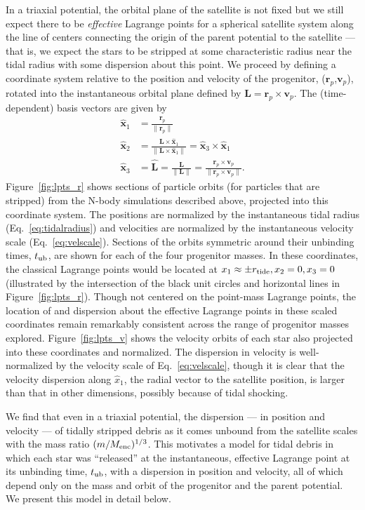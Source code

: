 \documentclass[letterpaper,12pt,preprint]{aastex}
\newcommand{\rtide}{r_{\rm tide}}
\newcommand{\bs}{\boldsymbol}
\newcommand{\tub}{t_{\rm ub}}
\begin{document}
In a triaxial potential, the orbital plane of the satellite is not fixed but we still expect there to be \emph{effective} Lagrange points for a spherical satellite system along the line of centers connecting the origin of the parent potential to the satellite --- that is, we expect the stars to be stripped at some characteristic radius near the tidal radius with some dispersion about this point. We proceed by defining a coordinate system relative to the position and velocity of the progenitor, ($\bs{r}_p$,$\bs{v}_p$), rotated into the instantaneous orbital plane defined by $\bs{L} = \bs{r}_p \times \bs{v}_p$. The (time-dependent) basis vectors are given by
\begin{align}
	\hat{\bs{x}}_1 &= \frac{\bs{r}_p}{\|\bs{r}_p\|}\label{eq:x1}\\
	\hat{\bs{x}}_2 &= \frac{\bs{L} \times \hat{\bs{x}}_1}{\|\bs{L} \times \hat{\bs{x}}_1\|} = \hat{\bs{x}}_3 \times \hat{\bs{x}}_1\\
	\hat{\bs{x}}_3 &= \hat{\bs{L}} = \frac{\bs{L}}{\|\bs{L}\|} = \frac{\bs{r}_p \times \bs{v}_p}{\|\bs{r}_p \times \bs{v}_p\|}\label{eq:x3}.
\end{align}
Figure~\ref{fig:lpts_r} shows sections of particle orbits (for particles that are stripped) from the N-body simulations described above, projected into this coordinate system. The positions are normalized by the instantaneous tidal radius (Eq.~\ref{eq:tidalradius}) and velocities are normalized by the instantaneous velocity scale (Eq.~\ref{eq:velscale}). Sections of the orbits symmetric around their unbinding times, $\tub$, are shown for each of the four progenitor masses. In these coordinates, the classical Lagrange points would be located at $x_1\approx\pm\rtide,x_2=0,x_3=0$ (illustrated by the intersection of the black unit circles and horizontal lines in Figure~\ref{fig:lpts_r}). Though not centered on the point-mass Lagrange points, the location of and dispersion about the effective Lagrange points in these scaled coordinates remain remarkably consistent across the range of progenitor masses explored. Figure~\ref{fig:lpts_v} shows the velocity orbits of each star also projected into these coordinates and normalized. The dispersion in velocity is well-normalized by the velocity scale of Eq.~\ref{eq:velscale}, though it is clear that the velocity dispersion along $\hat{x}_1$, the radial vector to the satellite position, is larger than that in other dimensions, possibly because of tidal shocking. 

We find that even in a triaxial potential, the dispersion --- in position and velocity --- of tidally stripped debris as it comes unbound from the satellite scales with the mass ratio $(m / M_{\rm enc})^{1/3}$. This motivates a model for tidal debris in which each star was ``released'' at the instantaneous, effective Lagrange point at its unbinding time, $\tub$, with a dispersion in position and velocity, all of which depend only on the mass and orbit of the progenitor and the parent potential. We present this model in detail below.
\end{document}
